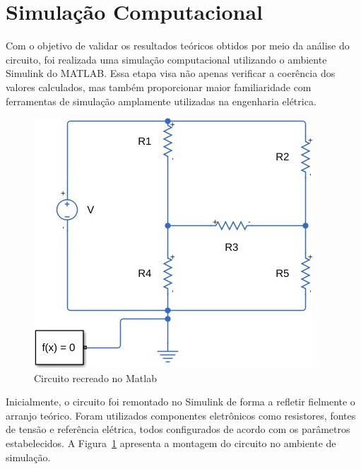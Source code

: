 \section{Simulação Computacional}

Com o objetivo de validar os resultados teóricos obtidos por meio da análise do
circuito, foi realizada uma simulação computacional utilizando o ambiente
Simulink do MATLAB. Essa etapa visa não apenas verificar a coerência dos valores
calculados, mas também proporcionar maior familiaridade com ferramentas de
simulação amplamente utilizadas na engenharia elétrica.

\begin{figure}[H]
  \centering
  \includegraphics[width=0.5\linewidth]{fig/lab1circuitmatlab.png}
  \caption{Circuito recreado no Matlab}
  \label{fig:circuit-simulink}
\end{figure}

Inicialmente, o circuito foi remontado no Simulink de forma a refletir fielmente
o arranjo teórico. Foram utilizados componentes eletrônicos como resistores,
fontes de tensão e referência elétrica, todos configurados de acordo com os
parâmetros estabelecidos. A Figura~\ref{fig:circuit-simulink} apresenta a
montagem do circuito no ambiente de simulação.


